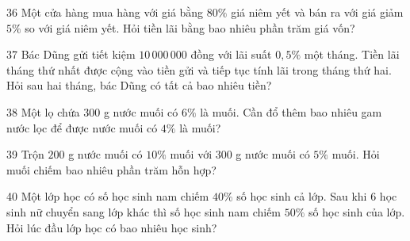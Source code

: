 \gap
\begin{probbox}{36}{}
Một cửa hàng mua hàng với giá bằng $80\%$ giá niêm yết và bán ra với giá giảm $5\%$ so với giá niêm yết. Hỏi tiền lãi bằng bao nhiêu phần trăm giá vốn?
\end{probbox}
\gap
\begin{probbox}{37}{}
Bác Dũng gửi tiết kiệm $10\,000\,000$ đồng với lãi suất $0{,}5\%$ một tháng. Tiền lãi tháng thứ nhất được cộng vào tiền gửi và tiếp tục tính lãi trong tháng thứ hai. Hỏi sau hai tháng, bác Dũng có tất cả bao nhiêu tiền?
\end{probbox}
\gap
\begin{probbox}{38}{}
Một lọ chứa $300$ g nước muối có $6\%$ là muối. Cần đổ thêm bao nhiêu gam nước lọc để được nước muối có $4\%$ là muối?
\end{probbox}
\gap
\begin{probbox}{39}{}
Trộn $200$ g nước muối có $10\%$ muối với $300$ g nước muối có $5\%$ muối. Hỏi muối chiếm bao nhiêu phần trăm hỗn hợp?
\end{probbox}
\gap
\begin{probbox}{40}{}
Một lớp học có số học sinh nam chiếm $40\%$ số học sinh cả lớp. Sau khi $6$ học sinh nữ chuyển sang lớp khác thì số học sinh nam chiếm $50\%$ số học sinh của lớp. Hỏi lúc đầu lớp học có bao nhiêu học sinh?
\end{probbox}
